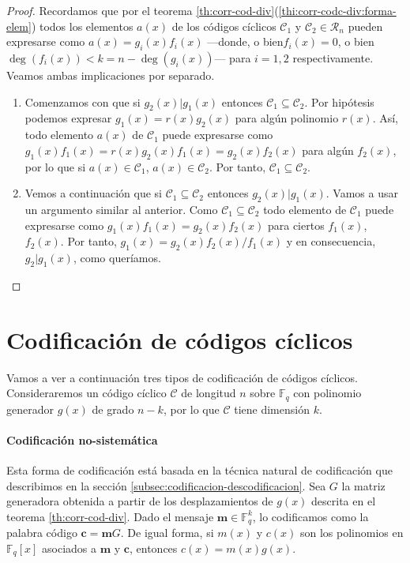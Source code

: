 \begin{proof}
  Recordamos que por el teorema \ref{th:corr-cod-div}(\ref{thi:corr-codc-div:forma-elem}) todos los elementos \(a(x)\) de los códigos cíclicos \(\mathcal C_1\) y \(\mathcal C_2 \in \mathcal R_n\) pueden expresarse como \(a(x) = g_i(x)f_i(x)\) —donde, o bien\(f_i(x) = 0\), o bien \(\deg(f_i(x)) < k = n - \deg(g_i(x))\)— para \(i = 1, 2\) respectivamente.
  Veamos ambas implicaciones por separado.
  \begin{enumerate}
    \item Comenzamos con que si \(g_2(x) | g_1(x)\) entonces \(\mathcal C_1 \subseteq \mathcal C_2\).
    Por hipótesis podemos expresar \(g_1(x) = r(x)g_2(x)\) para algún polinomio \(r(x)\).
    Así, todo elemento \(a(x)\) de \(\mathcal C_1\) puede expresarse como \(g_1(x)f_1(x) = r(x)g_2(x)f_1(x) = g_2(x)f_2(x)\) para algún \(f_2(x)\), por lo que si \(a(x) \in \mathcal C_1\), \(a(x) \in \mathcal C_2\).
    Por tanto, \(\mathcal C_1 \subseteq \mathcal C_2\).
    \item Vemos a continuación que si \(\mathcal C_1 \subseteq \mathcal C_2\) entonces \(g_2(x) | g_1(x)\).
    Vamos a usar un argumento similar al anterior.
    Como \(\mathcal C_1 \subseteq \mathcal C_2\) todo elemento de \(\mathcal C_1\) puede expresarse como \(g_1(x)f_1(x) = g_2(x)f_2(x)\) para ciertos \(f_1(x)\), \(f_2(x)\).
    Por tanto, \(g_1(x) = g_2(x)f_2(x)/f_1(x)\) y en consecuencia, \(g_2 | g_1(x)\), como queríamos.\qedhere
  \end{enumerate}
\end{proof}

\section{Codificación de códigos cíclicos}

Vamos a ver a continuación tres tipos de codificación de códigos cíclicos.
Consideraremos un código cíclico \(\mathcal C\) de longitud \(n\) sobre \(\mathbb F_q\) con polinomio generador \(g(x)\) de grado \(n - k\), por lo que \(\mathcal C\) tiene dimensión \(k\).

\paragraph{Codificación no-sistemática}

Esta forma de codificación está basada en la técnica natural de codificación que describimos en la sección \ref{subsec:codificacion-descodificacion}.
Sea \(G\) la matriz generadora obtenida a partir de los desplazamientos de \(g(x)\) descrita en el teorema \ref{th:corr-cod-div}.
Dado el mensaje \(\mathbf m \in \mathbb F_q^k\), lo codificamos como la palabra código \(\mathbf c = \mathbf mG\).
De igual forma, si \(m(x)\) y \(c(x)\) son los polinomios en \(\mathbb F_q[x]\) asociados a \(\mathbf{m}\) y \(\mathbf c\), entonces \(c(x) = m(x)g(x)\).

